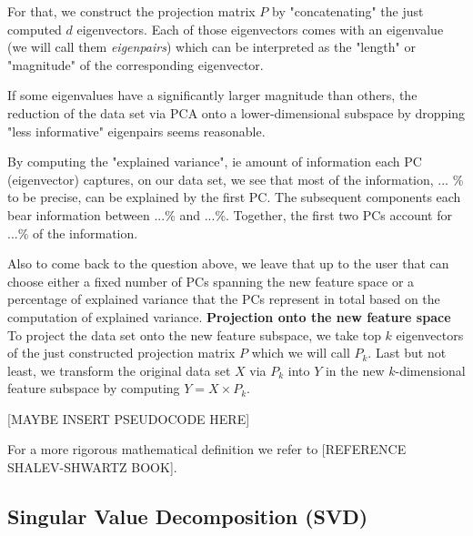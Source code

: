 \documentclass[journal, a4paper]{IEEEtran}
\begin{document}

For that, we construct the projection matrix \( P \) by "concatenating" the just computed \( d \) eigenvectors. Each of those eigenvectors comes with an eigenvalue (we will call them \textit{eigenpairs}) which can be interpreted as the "length" or "magnitude" of the corresponding eigenvector. 

If some eigenvalues have a significantly larger magnitude than others, the reduction of the data set via PCA onto a lower-dimensional subspace by dropping "less informative" eigenpairs seems reasonable.

By computing the "explained variance", ie amount of information each PC (eigenvector) captures, on our data set, we see that most of the information, ... \% to be precise, can be explained by the first PC. The subsequent components each bear information between ...\% and ...\%. Together, the first two PCs account for ...\% of the information.

Also to come back to the question above, we leave that up to the user that can choose either a fixed number of PCs spanning the new feature space or a percentage of explained variance that the PCs represent in total based on the computation of explained variance.
\newline
\textbf{Projection onto the new feature space}
To project the data set onto the new feature subspace, we take top \( k \) eigenvectors of the just constructed projection matrix \( P \) which we will call \( P_{k} \).
Last but not least, we transform the original data set \( X \) via \( P_{k} \) into \( Y \) in the new \(k\)-dimensional feature subspace by computing \( Y = X \times P_{k} \).

[MAYBE INSERT PSEUDOCODE HERE]

For a more rigorous mathematical definition we refer to [REFERENCE SHALEV-SHWARTZ BOOK].



\subsection{Singular Value Decomposition (SVD)}\label{svd}
\end{document}
